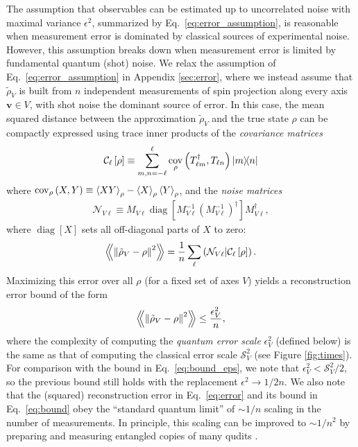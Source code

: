 \documentclass[notitlepage,twocolumn]{revtex4-2}
\newcommand{\f}[2]{\dfrac{#1}{#2}} %
\newcommand{\p}[1]{\left(#1\right)} %
\renewcommand{\sp}[1]{\left[#1\right]} %
\newcommand{\bk}{\Braket} %
\renewcommand{\v}{\bm} %
\newcommand{\Bbk}[1]
{\left\langle\!\!\left\langle #1 \right\rangle\!\!\right\rangle}
\newcommand{\C}{\mathcal{C}}
\newcommand{\N}{\mathcal{N}}
\renewcommand{\S}{\mathcal{S}}
\def\obk#1{\mathinner{({#1})}}
\DeclareMathOperator{\cov}{cov}
\DeclareMathOperator{\diag}{diag}
\newcommand{\1}{\mathds{1}}
\begin{document}
The assumption that observables can be estimated up to uncorrelated noise with maximal variance $\epsilon^2$, summarized by Eq.~\eqref{eq:error_assumption}, is reasonable when measurement error is dominated by classical sources of experimental noise.
However, this assumption breaks down when measurement error is limited by fundamental quantum (shot) noise.
We relax the assumption of Eq.~\eqref{eq:error_assumption} in Appendix \ref{sec:error}, where we instead assume that $\tilde\rho_V$ is built from $n$ independent measurements of spin projection along every axis $\v v\in V$, with shot noise the dominant source of error.
In this case, the mean squared distance between the approximation $\tilde\rho_V$ and the true state $\rho$ can be compactly expressed using trace inner products of the {\it covariance matrices}
\begin{align}
  \C_\ell\sp{\rho} \equiv \sum_{m,n=-\ell}^\ell
  \cov_\rho\p{T_{\ell m}^\dag, T_{\ell n}} \op{m}{n}
\end{align}
where $\cov_\rho\p{X,Y} \equiv \bk{XY}_\rho - \bk{X}_\rho \bk{Y}_\rho$, and the {\it noise matrices}
\begin{align}
  \N_{V\ell} \equiv M_{V\ell} \diag\sp{M_{V\ell}^{-1}
    \p{M_{V\ell}^{-1}}^\dag} M_{V\ell}^\dag,
\end{align}
where $\diag\sp{X}$ sets all off-diagonal parts of $X$ to zero:
\begin{align}
  \Bbk{\norm{\tilde\rho_V-\rho}^2}
  = \f1n \sum_\ell \obk{\N_{V\ell}|\C_\ell\sp{\rho}}.
  \label{eq:error}
\end{align}
Maximizing this error over all $\rho$ (for a fixed set of axes $V$) yields a reconstruction error bound of the form
\begin{align}
  \Bbk{\norm{\tilde\rho_V-\rho}^2} \le \f{\epsilon_V^2}{n},
  \label{eq:bound}
\end{align}
where the complexity of computing the {\it quantum error scale} $\epsilon_V^2$ (defined below) is the same as that of computing the classical error scale $\S_V^2$ (see Figure \ref{fig:times}).
For comparison with the bound in Eq.~\eqref{eq:bound_eps}, we note that $\epsilon_V^2<\S_V^2/2$, so the previous bound still holds with the replacement $\epsilon^2\to1/2n$.
We also note that the (squared) reconstruction error in Eq.~\eqref{eq:error} and its bound in Eq.~\eqref{eq:bound} obey the ``standard quantum limit'' of $\sim1/n$ scaling in the number of measurements.
In principle, this scaling can be improved to $\sim1/n^2$ by preparing and measuring entangled copies of many qudits \cite{giovannetti2006quantum}.
\end{document}
